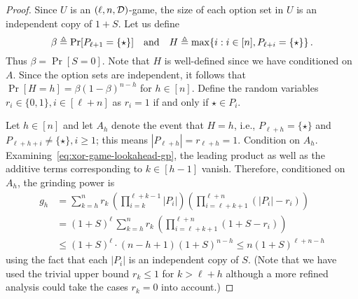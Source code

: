     \begin{proof}
        Since $U$ is an $(\ell, n, \mathcal{D})$-game, 
        the size of each option set in $U$ is an independent copy of $1 + S$.
        Let us define 
        $$\beta \triangleq \Pr[P_{\ell + 1} = \{\star \}]
        \quad\text{and}\quad
        H \triangleq \max \{i : i \in [n], P_{\ell + i} = \{\star \}\}
        \,.
        $$
        Thus $\beta = \Pr[S = 0]$. 
        Note that $H$ is well-defined since we have conditioned on $A$. 
        Since the option sets are independent, 
        it follows that 
        $\Pr[H = h] = \beta (1 - \beta)^{n - h}$ for $h \in [n]$. 
        Define the random variables $r_i \in \{0,1\}, i \in [\ell + n]$ 
        as $r_i = 1$ if and only if $\star \in P_i$. 


        Let $h \in [n]$ and 
        let $A_h$ denote the event that $H = h$, i.e., 
        $P_{\ell + h} = \{\star\}$ and $P_{\ell + h + i} \neq \{\star\}, i \geq 1$; 
        this means $|P_{\ell +h}| = r_{\ell + h} = 1$. 
        Condition on $A_h$. 
        Examining~\eqref{eq:xor-game-lookahead-gp}, 
        the leading product 
        as well as the additive terms corresponding to $k \in [h - 1]$ vanish. 
        Therefore, conditioned on $A_h$, the grinding power is
        \begin{align}
            g_h 
            &= \sum_{k=h}^{n }
               r_k \, 
               \left(\prod_{i=k}^{\ell+k-1}|P_i| \right) 
               \left(\prod_{i=\ell+k+1}^{\ell+n} (|P_i| - r_i) \right) \nonumber \\
            &= (1 + S)^\ell\,
               \sum_{k=h}^{n }
               r_k\,  
               \left(\prod_{i=\ell+k+1}^{\ell+n} (1 + S - r_i) \right) \label{eq:ell-n-d-game-bound-gh}\\
            &\leq (1 + S)^\ell \cdot
               (n - h + 1)
               (1 + S)^{n - h} 
            \leq n (1 + S)^{\ell + n - h}
        \end{align}
        using 
        the fact that each $|P_i|$ is an independent copy of $S$. 
        (Note that we have used the trivial upper bound $r_k \leq 1$ for $k > \ell + h$  
        although a more refined analysis could take 
        the cases $r_k = 0$ into account.)


\end{proof}
